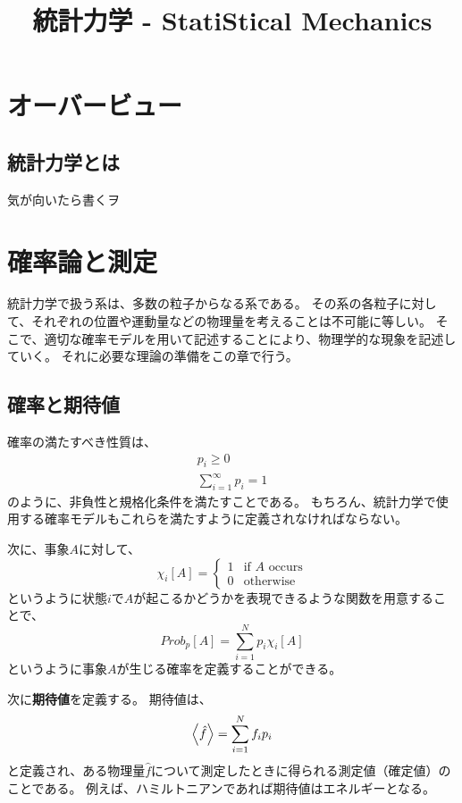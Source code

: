 \documentclass[a4paper]{jsreport}
\title{統計力学 - StatiStical Mechanics}
\begin{document}
    \maketitle

    \tableofcontents

    \chapter{オーバービュー}

        \section{統計力学とは}
            気が向いたら書くヲ

    \chapter{確率論と測定}
            
            統計力学で扱う系は、多数の粒子からなる系である。
            その系の各粒子に対して、それぞれの位置や運動量などの物理量を考えることは不可能に等しい。
            そこで、適切な確率モデルを用いて記述することにより、物理学的な現象を記述していく。
            それに必要な理論の準備をこの章で行う。

        \section{確率と期待値}
            確率の満たすべき性質は、
            \begin{align}
                p_i \ge 0 \\
                \sum_{i=1}^{\infty} p_i = 1
            \end{align}
            のように、非負性と規格化条件を満たすことである。
            もちろん、統計力学で使用する確率モデルもこれらを満たすように定義されなければならない。\par
            次に、事象$A$に対して、
            \begin{equation}
                \chi_i[A] = \begin{cases}
                    1 & \text{if $A$ occurs} \\
                    0 & \text{otherwise}
                \end{cases}
            \end{equation}
            というように状態$i$で$A$が起こるかどうかを表現できるような関数を用意することで、
            \begin{equation}
                Prob_p[A] = \sum_{i=1}^{N} p_i \chi_i[A]
            \end{equation}
            というように事象$A$が生じる確率を定義することができる。\par
            次に\textbf{期待値}を定義する。
            期待値は、
            \begin{equation}
                \ev{\hat{f}} = \sum_{i=1}^{N} f_i p_i 
            \end{equation}
            と定義され、ある物理量$\hat{f}$について測定したときに得られる測定値（確定値）のことである。
            例えば、ハミルトニアンであれば期待値はエネルギーとなる。
\end{document}
